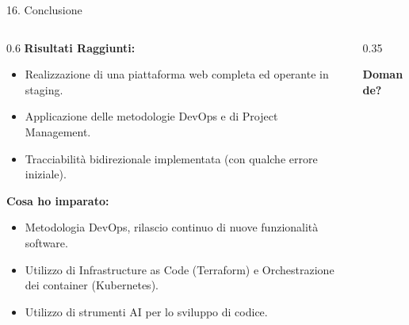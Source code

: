 \documentclass[aspectratio=169, 10pt]{beamer}
\begin{document}
\begin{frame}{16. Conclusione}
  \begin{columns}
    \begin{column}{0.6\textwidth}
      \textbf{Risultati Raggiunti:}
      \begin{itemize}
        \item Realizzazione di una piattaforma web completa ed operante in staging.
        \item Applicazione delle metodologie DevOps e di Project Management.
        \item Tracciabilità bidirezionale implementata (con qualche errore iniziale).
      \end{itemize}
      \vspace{0.3cm}
      \textbf{Cosa ho imparato:}
      \begin{itemize}
        \item Metodologia DevOps, rilascio continuo di nuove funzionalità software. 
        \item Utilizzo di Infrastructure as Code (Terraform) e Orchestrazione dei container (Kubernetes).
        \item Utilizzo di strumenti AI per lo sviluppo di codice.
      \end{itemize}
    \end{column}
    \begin{column}{0.35\textwidth}
      \begin{tcolorbox}[colback=karateDark, colframe=karateDark, title=\color{white}Grazie per l'Attenzione]
        \color{white}
        \centering
        \vspace{0.5cm}
        \textbf{Domande?}
        \vspace{0.8cm}
      \end{tcolorbox}
    \end{column}
  \end{columns}
\end{frame}
\end{document}
